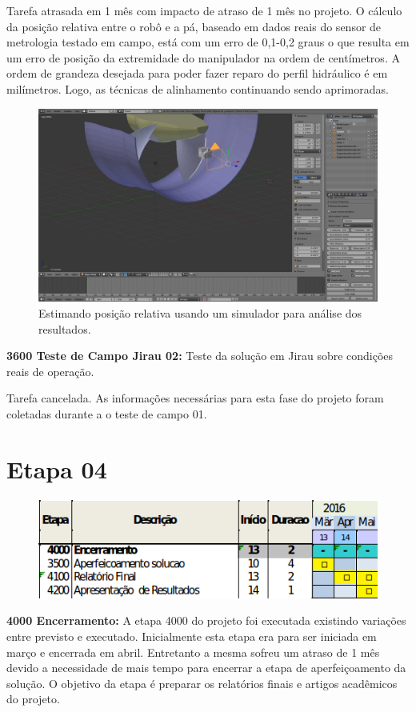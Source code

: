 Tarefa atrasada em 1 mês com impacto de atraso de 1 mês no projeto. O cálculo da
posição relativa entre o robô e a pá, baseado em dados reais do sensor de
metrologia testado em campo, está com um erro de 0,1-0,2 graus o que resulta em
um erro de posição da extremidade do manipulador na ordem de centímetros. A
ordem de grandeza desejada para poder fazer reparo do perfil hidráulico é em
milímetros. Logo, as técnicas de alinhamento continuando sendo aprimoradas.

\begin{figure}\centering
\includegraphics[width=0.6\columnwidth]{figs/blensor_screen}
\caption{Estimando posição relativa usando um simulador para análise dos
resultados.}
\end{figure} 


\textbf{3600 Teste de Campo Jirau 02:} Teste da solução  em Jirau sobre
condições reais de operação.

Tarefa cancelada. As informações necessárias para esta fase do
projeto foram coletadas durante a o teste de campo 01. 

\section{Etapa 04} 

\begin{figure}
\centering
\includegraphics[width=0.9\columnwidth]{figs/etapa4}
\end{figure} 

\textbf{4000 Encerramento:} A etapa 4000 do projeto foi executada existindo
variações entre previsto e executado. Inicialmente esta etapa era para ser
iniciada em março e encerrada em abril. Entretanto a mesma sofreu um atraso de 1
mês devido a necessidade de mais tempo para encerrar a etapa de aperfeiçoamento
da solução. O objetivo da etapa é preparar os relatórios finais e artigos acadêmicos do projeto.

